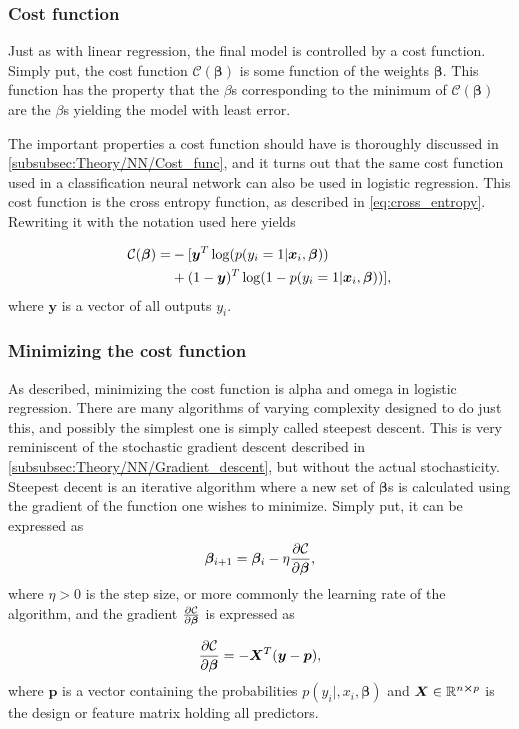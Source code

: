 \documentclass[10pt, twocolumn]{article}
\begin{document}
\subsubsection{Cost function}
Just as with linear regression, the final model is controlled by a cost function. Simply put, the cost function $\mathcal{C}(\bm{\beta})$ is some function of the weights $\bm{\beta}$. This function has the property that the $\beta$s corresponding to the minimum of $\mathcal{C}(\bm{\beta})$ are the $\beta$s yielding the model with least error. 

The important properties a cost function should have is thoroughly discussed in \cref{subsubsec:Theory/NN/Cost_func}, and it turns out that the same cost function used in a classification neural network can also be used in logistic regression. This cost function is the cross entropy function, as described in \cref{eq:cross_entropy}. Rewriting it with the notation used here yields 

\begin{align}\label{eq:cost_function_logreg}
    \mathcal{C}(\bm{\beta}) = &-[\bm{y}^T\log(p(y_i = 1|\bm{x}_i, \bm{\beta})) \notag\\
    &+ (1-\bm{y})^T\log(1 - p(y_i = 1|\bm{x}_i, \bm{\beta}))],
\end{align}
where $\bm{y}$ is a vector of all outputs $y_i$.

\subsubsection{Minimizing the cost function}
As described, minimizing the cost function is alpha and omega in logistic regression. There are many algorithms of varying complexity designed to do just this, and possibly the simplest one is simply called steepest descent. This is very reminiscent of the stochastic gradient descent described in \cref{subsubsec:Theory/NN/Gradient_descent}, but without the actual stochasticity. Steepest decent is an iterative algorithm where a new set of $\bm{\beta}$s is calculated using the gradient of the function one wishes to minimize. Simply put, it can be expressed as
\begin{align}\label{eq:steepest_descent}
    \bm{\beta}_{i+1} = \bm{\beta}_i - \eta\pdv{\mathcal{C}}{\bm{\beta}},
\end{align}
where $\eta > 0$ is the step size, or more commonly the learning rate of the algorithm, and the gradient $\pdv{\mathcal{C}}{\bm{\beta}}$ is expressed as

\begin{align}\label{eq:cost_function_gradient}
    \pdv{\mathcal{C}}{\bm{\beta}} = -\bm{X}^T(\bm{y}-\bm{p}),
\end{align}
where $\bm{p}$ is a vector containing the probabilities $p(y_i|,x_i,\bm{\beta})$ and $\bm{X}\in\mathbb{R}^{n\cross p}$ is the design or feature matrix holding all predictors.
\end{document}
